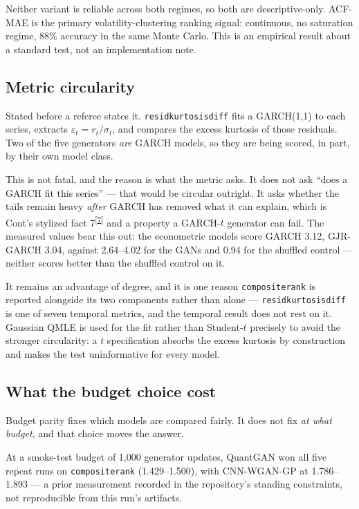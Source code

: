 \documentclass[11pt,a4paper]{article}
\makeatletter
\newcommand{\tcite}[1]{\textsuperscript{[\hyperlink{R:#1}{#1}]}}
\DeclareRobustCommand{\_}{\ifmmode\nfss@text{\textunderscore}\else\textunderscore\allowbreak\fi}
\makeatother
\begin{document}
Neither variant is reliable across both regimes, so both are descriptive-only. ACF-MAE is the primary volatility-clustering ranking signal: continuous, no saturation regime, $88\%$ accuracy in the same Monte Carlo. This is an empirical result about a standard test, not an implementation note.

\subsection{Metric circularity}
\label{sec:circularity}
Stated before a referee states it. \texttt{resid\_kurtosis\_diff} fits a GARCH(1,1) to each series, extracts $\varepsilon_t = r_t/\sigma_t$, and compares the excess kurtosis of those residuals. Two of the five generators \emph{are} GARCH models, so they are being scored, in part, by their own model class.

This is not fatal, and the reason is what the metric asks. It does not ask ``does a GARCH fit this series'' --- that would be circular outright. It asks whether the tails remain heavy \emph{after} GARCH has removed what it can explain, which is Cont's stylized fact 7\tcite{7} and a property a GARCH-$t$ generator can fail. The measured values bear this out: the econometric models score GARCH 3.12, GJR-GARCH 3.04, against 2.64--4.02 for the GANs and 0.94 for the shuffled control --- neither scores better than the shuffled control on it.

It remains an advantage of degree, and it is one reason \texttt{composite\_rank} is reported alongside its two components rather than alone --- \texttt{resid\_kurtosis\_diff} is one of seven temporal metrics, and the temporal result does not rest on it. Gaussian QMLE is used for the fit rather than Student-$t$ precisely to avoid the stronger circularity: a $t$ specification absorbs the excess kurtosis by construction and makes the test uninformative for every model.

\subsection{What the budget choice cost}
\label{sec:budget}
Budget parity fixes which models are compared fairly. It does not fix \emph{at what budget}, and that choice moves the answer.

At a smoke-test budget of 1{,}000 generator updates, QuantGAN won all five repeat runs on \texttt{composite\_rank} (1.429--1.500), with CNN-WGAN-GP at 1.786--1.893 --- a prior measurement recorded in the repository's standing constraints, not reproducible from this run's artifacts.
\end{document}
